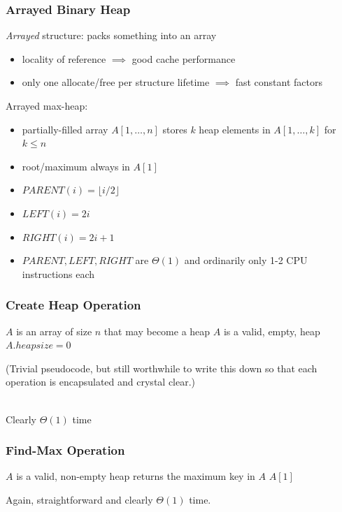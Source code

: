\documentclass{beamer}
\newcommand{\stanza}{ \\~\ }
\begin{document}
\begin{frame} \frametitle{Arrayed Binary Heap}

\emph{Arrayed} structure: packs something into an array
\begin{itemize}
  \item locality of reference $\implies$ good cache performance
  \item only one allocate/free per structure lifetime $\implies$ fast constant factors
\end{itemize}

Arrayed max-heap:
\begin{itemize}
  \item partially-filled array $A[1, \ldots, n]$ stores $k$ heap elements in $A[1, \ldots, k]$ for $k \leq n$
  \item root/maximum always in $A[1]$
  \item $PARENT(i) = \lfloor i/2 \rfloor$
  \item $LEFT(i) = 2i$
  \item $RIGHT(i) = 2i+1$
  \item $PARENT, LEFT, RIGHT$ are $\Theta(1)$ and ordinarily only 1-2 CPU instructions each
\end{itemize}
\end{frame}

\begin{frame} \frametitle{Create Heap Operation}
  \begin{algorithmic}[1]
    \Require $A$ is an array of size $n$ that may become a heap
    \Ensure $A$ is a valid, empty, heap
    \State $A.heapsize = 0$
    \EndFunction
  \end{algorithmic}
  \vspace{.5cm}

  (Trivial pseudocode, but still worthwhile to write this down so that each operation
   is encapsulated and crystal clear.) \stanza

  Clearly $\Theta(1)$ time
\end{frame}

\begin{frame} \frametitle{Find-Max Operation}
\begin{algorithmic}[1]
  \Require $A$ is a valid, non-empty heap
  \Ensure returns the maximum key in $A$
  \State \Return $A[1]$
  \EndFunction
\end{algorithmic}
\vspace{.5cm}

Again, straightforward and clearly $\Theta(1)$ time.
\end{frame}
\end{document}
